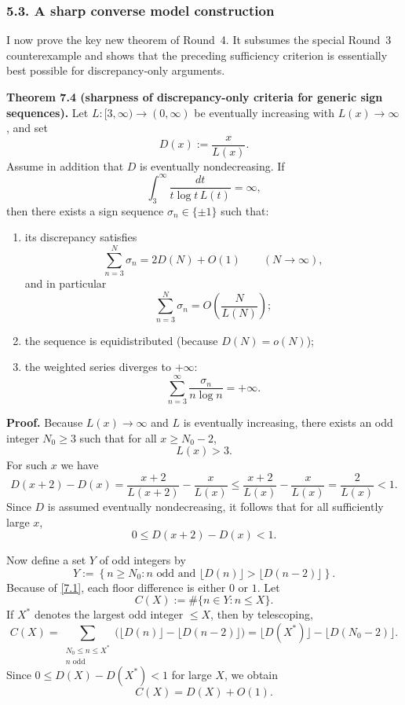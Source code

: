 \subsubsection*{5.3. A sharp converse model construction}

I now prove the key new theorem of Round~4. It subsumes the special Round~3 counterexample and shows that the preceding sufficiency criterion is essentially best possible for discrepancy-only arguments.

\textbf{Theorem 7.4 (sharpness of discrepancy-only criteria for generic sign sequences).}
Let $L:[3,\infty)\to(0,\infty)$ be eventually increasing with $L(x)\to\infty$, and set
\[
D(x):=\frac{x}{L(x)}.
\]
Assume in addition that $D$ is eventually nondecreasing. If
\[
\int_3^\infty \frac{dt}{t\log t\,L(t)} = \infty,
\]
then there exists a sign sequence $\sigma_n\in\{\pm1\}$ such that:

\begin{enumerate}
\item[(i)] its discrepancy satisfies
\[
\sum_{n=3}^N \sigma_n = 2D(N)+O(1)
\qquad (N\to\infty),
\]
and in particular
\[
\sum_{n=3}^N \sigma_n = O\!\left(\frac{N}{L(N)}\right);
\]

\item[(ii)] the sequence is equidistributed (because $D(N)=o(N)$);

\item[(iii)] the weighted series diverges to $+\infty$:
\[
\sum_{n=3}^\infty \frac{\sigma_n}{n\log n}=+\infty.
\]
\end{enumerate}

\textbf{Proof.}
Because $L(x)\to\infty$ and $L$ is eventually increasing, there exists an odd integer $N_0\ge 3$ such that for all $x\ge N_0-2$,
\[
L(x)>3.
\]
For such $x$ we have
\[
D(x+2)-D(x)
=
\frac{x+2}{L(x+2)}-\frac{x}{L(x)}
\le
\frac{x+2}{L(x)}-\frac{x}{L(x)}
=
\frac{2}{L(x)}<1.
\]
Since $D$ is assumed eventually nondecreasing, it follows that for all sufficiently large $x$,
\[
0\le D(x+2)-D(x)<1.
\tag{7.1}
\]

Now define a set $Y$ of odd integers by
\[
Y:=\left\{n\ge N_0: n\text{ odd and }\lfloor D(n)\rfloor>\lfloor D(n-2)\rfloor\right\}.
\]
Because of \eqref{7.1}, each floor difference is either $0$ or $1$.
Let
\[
C(X):=\#\{n\in Y: n\le X\}.
\]
If $X^*$ denotes the largest odd integer $\le X$, then by telescoping,
\[
C(X)
=
\sum_{\substack{N_0\le n\le X^*\\ n\text{ odd}}}
\bigl(\lfloor D(n)\rfloor-\lfloor D(n-2)\rfloor\bigr)
=
\lfloor D(X^*)\rfloor-\lfloor D(N_0-2)\rfloor.
\]
Since $0\le D(X)-D(X^*)<1$ for large $X$, we obtain
\[
C(X)=D(X)+O(1).
\tag{7.2}
\]

